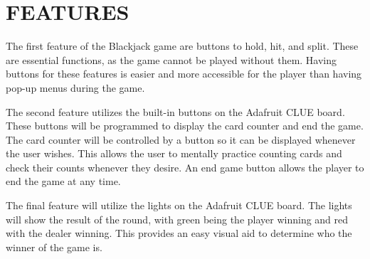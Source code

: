 \documentclass[12pt]{article}
\begin{document}
\section{FEATURES}

The first feature of the Blackjack game are buttons to hold, hit, and split. These are essential functions, as the game cannot be played without them. Having buttons for these features is easier and more accessible for the player than having pop-up menus during the game.

The second feature utilizes the built-in buttons on the Adafruit CLUE board. These buttons will be programmed to display the card counter and end the game. The card counter will be controlled by a button so it can be displayed whenever the user wishes. This allows the user to mentally practice counting cards and check their counts whenever they desire. An end game button allows the player to end the game at any time.

The final feature will utilize the lights on the Adafruit CLUE board. The lights will show the result of the round, with green being the player winning and red with the dealer winning. This provides an easy visual aid to determine who the winner of the game is.


\end{document}
